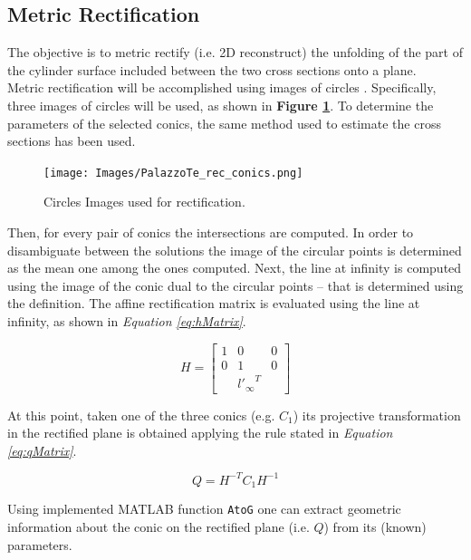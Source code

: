 \documentclass[12pt,a4paper]{article}
\begin{document}
\subsection{Metric Rectification}
\label{sec:shapeReconstruction}
The objective is to metric rectify (i.e. 2D reconstruct) the unfolding of the part of the cylinder surface included between the two cross sections onto a plane.\\

Metric rectification will be accomplished using images of circles \cite{MetRecCircles}. Specifically, three images of circles will be used, as shown in \textbf{Figure \ref{fig:recConics}}. To determine the parameters of the selected conics, the same method used to estimate the cross sections has been used.

\begin{figure}[H]
    \centering
    \texttt{[image: Images/PalazzoTe\_rec\_conics.png]}
    \caption[Circles Images used for rectification.]{Circles Images used for rectification.}
    \label{fig:recConics}
\end{figure}

Then, for every pair of conics the intersections are computed. In order to disambiguate between the solutions the image of the circular points is determined as the mean one among the ones computed. Next, the line at infinity is computed using the image of the conic dual to the circular points -- that is determined using the definition. The affine rectification matrix is evaluated using the line at infinity, as shown in \textit{Equation \ref{eq:hMatrix}}.

\begin{equation}
    H = 
    \begin{bmatrix}
    1 & 0 & 0\\
    0 & 1 & 0\\
    & {l'_\infty}^T &
    \end{bmatrix}
    \label{eq:hMatrix}
\end{equation}

\pagebreak

At this point, taken one of the three conics (e.g. $C_1$) its projective transformation in the rectified plane is obtained applying the rule stated in \textit{Equation \ref{eq:qMatrix}}.

\begin{equation}
    Q = H^{-T}C_1H^{-1}
    \label{eq:qMatrix}
\end{equation}
\bigskip

Using implemented MATLAB function \verb|AtoG| one can extract geometric information about the conic on the rectified plane (i.e. $Q$) from its (known) parameters.
\end{document}
